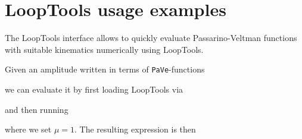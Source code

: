 \documentclass[../FeynHelpersManual.tex]{subfiles}
\begin{document}
\hypertarget{looptools usage examples}{
\section{LoopTools usage examples}\label{looptools usage examples}}

The LoopTools interface allows to quickly evaluate Passarino-Veltman
functions with suitable kinematics numerically using LoopTools.

Given an amplitude written in terms of \texttt{PaVe}-functions

\begin{Shaded}
\begin{Highlighting}[]
\ExtensionTok{=} \OperatorTok{[}\OperatorTok{[\{}\OperatorTok{,} \OperatorTok{,} \OperatorTok{,} \OperatorTok{\}]]}\NormalTok{;}
\end{Highlighting}
\end{Shaded}

we can evaluate it by first loading LoopTools via

\begin{Shaded}
\begin{Highlighting}[]
\OperatorTok{[]}
\end{Highlighting}
\end{Shaded}

and then running

\begin{Shaded}
\begin{Highlighting}[]
\ExtensionTok{=}\OperatorTok{[}\OperatorTok{,}\OtherTok{{-}\textgreater{}} \OperatorTok{,}\OtherTok{{-}\textgreater{}} \OperatorTok{\{}\OtherTok{{-}\textgreater{}} \OperatorTok{,}\OtherTok{{-}\textgreater{}} \OperatorTok{\}]}
\end{Highlighting}
\end{Shaded}

where we set \(\mu = 1\). The resulting expression is then

\begin{Shaded}
\begin{Highlighting}[]
\OperatorTok{[} \OperatorTok{\{} \OtherTok{{-}\textgreater{}} \OperatorTok{,}\OtherTok{{-}\textgreater{}} \OperatorTok{,}\OtherTok{{-}\textgreater{}} \OperatorTok{\},}\OperatorTok{]}
\end{Highlighting}
\end{Shaded}
\end{document}
